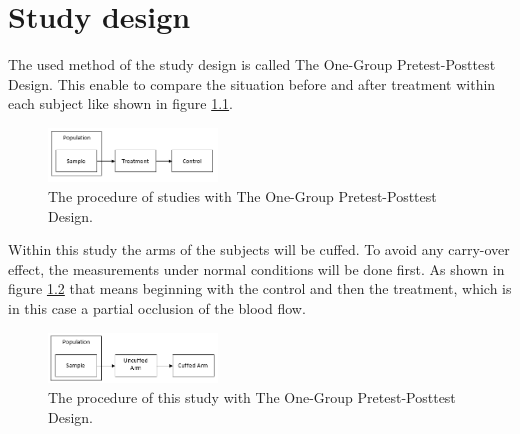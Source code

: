 \chapter{Study design}

The used method of the study design is called The One-Group Pretest-Posttest Design. This enable to compare the situation before and after treatment within each subject like shown in figure \ref{fig:design1}. \cite{gottman1969}
\begin{figure}[H]
	\includegraphics[width=0.4\textwidth]{figures/inseries1}
	\caption{The procedure of studies with The One-Group Pretest-Posttest Design.}
	\label{fig:design1}
\end{figure}

Within this study the arms of the subjects will be cuffed. To avoid any carry-over effect, the measurements under normal conditions will be done first. As shown in figure \ref{fig:design2} that means beginning with the control and then the treatment, which is in this case a partial occlusion of the blood flow.
\begin{figure}[H]
	\includegraphics[width=0.4\textwidth]{figures/inseries2}
	\caption{The procedure of this study with The One-Group Pretest-Posttest Design.}
	\label{fig:design2}
\end{figure}